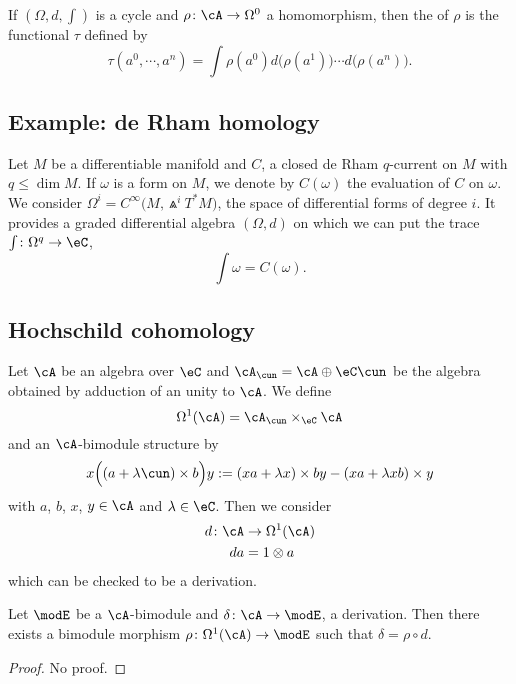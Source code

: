 If $(\Omega,d,\int)$ is a cycle and $\rho\colon \cA\to \Omega^0$ a homomorphism, then the  of $\rho$ is the functional $\tau$ defined by
\begin{equation}
\tau(a^0,\cdots,a^{n})=\int \rho(a^0)d\big( \rho(a^1) \big)\cdots d\big( \rho(a^{n}) \big).
\end{equation}


\subsection{Example: de Rham homology}

Let $M$ be a differentiable manifold and $C$, a closed de Rham $q$-current on $M$ with $q\leq\dim M$. If $\omega$ is a form on $M$, we denote by $C(\omega)$ the evaluation of $C$ on $\omega$. We consider $\Omega^{i}= C^{\infty}\big( M,\Wedge^i T^*M \big)$, the space of differential forms of degree $i$. It provides a graded differential algebra $(\Omega,d)$ on which we can put the trace $\int\colon \Omega^q\to \eC$,
\[
  \int \omega=C(\omega).
\]

\subsection{Hochschild cohomology}

Let $\cA$ be an algebra over $\eC$ and $\cA_{\cun}=\cA\oplus\eC\cun$ be the algebra obtained by adduction of an unity to $\cA$. We define
\[
  \Omega^1(\cA)=\cA_{\cun}\times_{\eC}\cA
\]
and an $\cA$-bimodule structure by
\[
  x\Big( (a+\lambda\cun)\times b \Big)y:=(xa+\lambda x)\times by-(xa+\lambda xb)\times y
\]
with $a$, $b$, $x$, $y\in\cA$ and $\lambda\in\eC$. Then we consider
\begin{equation}
\begin{aligned}
 d\colon \cA&\to \Omega^1(\cA) \\
da&= 1\otimes a
\end{aligned}
\end{equation}
which can be checked to be a derivation.

\begin{proposition}
Let $\modE$ be a $\cA$-bimodule and $\delta\colon \cA\to \modE$, a derivation. Then there exists a bimodule morphism $\rho\colon \Omega^1(\cA)\to \modE$ such that $\delta=\rho\circ d$.
\end{proposition}

\begin{proof}
No proof.
\end{proof}

